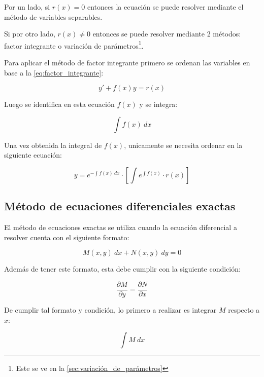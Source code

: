 Por un lado, si $r(x) = 0$ entonces la ecuación se puede resolver mediante el método de variables separables.

Si por otro lado, $r(x) \neq 0$ entonces se puede resolver mediante 2 métodos: factor integrante o variación de parámetros\footnote{Este se ve en la \autoref{sec:variación_de_parámetros}}.

Para aplicar el método de factor integrante primero se ordenan las variables en base a la \autoref{eq:factor_integrante}:

\begin{equation*}
    y' + f(x)y = r(x)
\end{equation*}

Luego se identifica en esta ecuación $f(x)$ y se integra:

\begin{equation*}
    \int{f(x) \ dx}
\end{equation*}

Una vez obtenida la integral de $f(x)$, unicamente se necesita ordenar en la siguiente ecuación:

\begin{equation*}
    y=e^{-\int{f(x) \ dx}} \cdot \left[ \int{e^{\int{f(x)}}} \cdot r(x) \right]
\end{equation*}

\subsection{Método de ecuaciones diferenciales exactas}

El método de ecuaciones exactas se utiliza cuando la ecuación diferencial a resolver cuenta con el siguiente formato:

\begin{equation*}
    M(x,y) \ dx + N(x,y) \ dy = 0
\end{equation*}

Además de tener este formato, esta debe cumplir con la siguiente condición:

\begin{equation*}
    \frac{\partial M}{\partial y} = \frac{\partial N}{\partial x}
\end{equation*}

De cumplir tal formato y condición, lo primero a realizar es  integrar $M$ respecto a $x$:

\begin{equation}\label{eq:integral_de_M}
    \int{M \ dx}
\end{equation}

